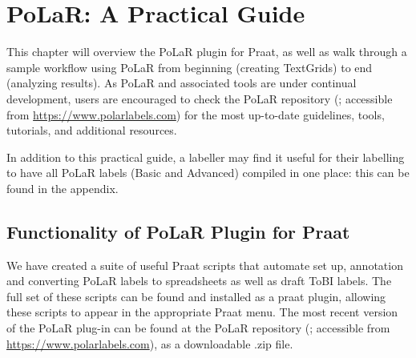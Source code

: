 \documentclass[11pt, twoside]{memoir}
\begin{document}
\chapter{PoLaR: A Practical Guide}\label{ch:practical}

This chapter will overview the PoLaR plugin for Praat, as well as walk through a sample workflow using PoLaR from beginning (creating TextGrids) to end (analyzing results). As PoLaR and associated tools are under continual development, users are encouraged to check the PoLaR repository (\citealt{ahn-21}; accessible from \href{https://www.polarlabels.com}{https://www.polarlabels.com}) for the most up-to-date guidelines, tools, tutorials, and additional resources.

In addition to this practical guide, a labeller may find it useful for their labelling to have all PoLaR labels (Basic and Advanced) compiled in one place: this can be found in the appendix.

\section{Functionality of PoLaR Plugin for Praat}\label{sec:polar-plugin-for-praat}
We have created a suite of useful Praat scripts that automate set up, annotation and converting PoLaR labels to spreadsheets as well as draft ToBI labels. The full set of these scripts can be found and installed as a praat plugin, allowing these scripts to appear in the appropriate Praat menu. The most recent version of the PoLaR plug-in can be found at the PoLaR repository (\citealt{ahn-21}; accessible from \href{https://www.polarlabels.com}{https://www.polarlabels.com}), as a downloadable .zip file.
\end{document}
